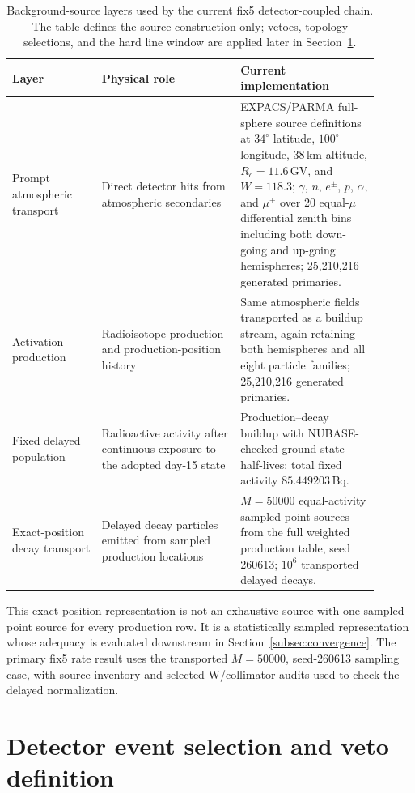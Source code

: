 \documentclass[preprint,12pt]{elsarticle}
\begin{document}
\begin{table}[t]
\centering
\caption{Background-source layers used by the current fix5 detector-coupled chain. The table defines the source construction only; vetoes, topology selections, and the hard line window are applied later in Section~\ref{sec:selection}.}
\label{tab:background_source_model}
\begin{tabular}{p{0.22\linewidth}p{0.34\linewidth}p{0.34\linewidth}}
\hline
Layer & Physical role & Current implementation \\
\hline
Prompt atmospheric transport & Direct detector hits from atmospheric secondaries & EXPACS/PARMA full-sphere source definitions at $34^\circ$ latitude, $100^\circ$ longitude, $38\,\mathrm{km}$ altitude, $R_c=11.6\,\mathrm{GV}$, and $W=118.3$; $\gamma$, $n$, $e^\pm$, $p$, $\alpha$, and $\mu^\pm$ over 20 equal-$\mu$ differential zenith bins including both down-going and up-going hemispheres; 25,210,216 generated primaries. \\
Activation production & Radioisotope production and production-position history & Same atmospheric fields transported as a buildup stream, again retaining both hemispheres and all eight particle families; 25,210,216 generated primaries. \\
Fixed delayed population & Radioactive activity after continuous exposure to the adopted day-15 state & Production--decay buildup with NUBASE-checked ground-state half-lives; total fixed activity $85.449203\,\mathrm{Bq}$. \\
Exact-position decay transport & Delayed decay particles emitted from sampled production locations & $M=50000$ equal-activity sampled point sources from the full weighted production table, seed 260613; $10^6$ transported delayed decays. \\
\hline
\end{tabular}
\end{table}

This exact-position representation is not an exhaustive source with one sampled point source for every production row. It is a statistically sampled representation whose adequacy is evaluated downstream in Section~\ref{subsec:convergence}. The primary fix5 rate result uses the transported $M=50000$, seed-260613 sampling case, with source-inventory and selected W/collimator audits used to check the delayed normalization.

\section{Detector event selection and veto definition}
\label{sec:selection}
\end{document}

